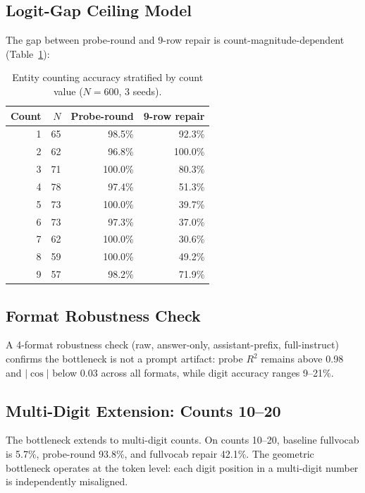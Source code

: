 \documentclass{article}
\begin{document}
\subsection{Logit-Gap Ceiling Model}
\label{sec:logit_gap_ceiling}

The gap between probe-round and 9-row repair is count-magnitude-dependent
(Table~\ref{tab:entity_count_stratified}):

\begin{table}[h]
\centering
\small
\caption{Entity counting accuracy stratified by count value ($N{=}600$, 3 seeds).}
\label{tab:entity_count_stratified}
\begin{tabular}{rrrr}
\toprule
Count & $N$ & Probe-round & 9-row repair \\
\midrule
1 & 65 & 98.5\% & 92.3\% \\
2 & 62 & 96.8\% & 100.0\% \\
3 & 71 & 100.0\% & 80.3\% \\
4 & 78 & 97.4\% & 51.3\% \\
5 & 73 & 100.0\% & 39.7\% \\
6 & 73 & 97.3\% & 37.0\% \\
7 & 62 & 100.0\% & 30.6\% \\
8 & 59 & 100.0\% & 49.2\% \\
9 & 57 & 98.2\% & 71.9\% \\
\bottomrule
\end{tabular}
\end{table}

\subsection{Format Robustness Check}
\label{sec:format_robustness}

A 4-format robustness check (raw, answer-only, assistant-prefix, full-instruct)
confirms the bottleneck is not a prompt artifact: probe $R^2$ remains above
0.98 and $|\cos|$ below 0.03 across all formats, while digit accuracy ranges
9--21\%.

\subsection{Multi-Digit Extension: Counts 10--20}
\label{sec:multidigit}

The bottleneck extends to multi-digit counts. On counts 10--20, baseline
fullvocab is 5.7\%, probe-round 93.8\%, and fullvocab repair 42.1\%. The
geometric bottleneck operates at the token level: each digit position in a
multi-digit number is independently misaligned.
\end{document}

